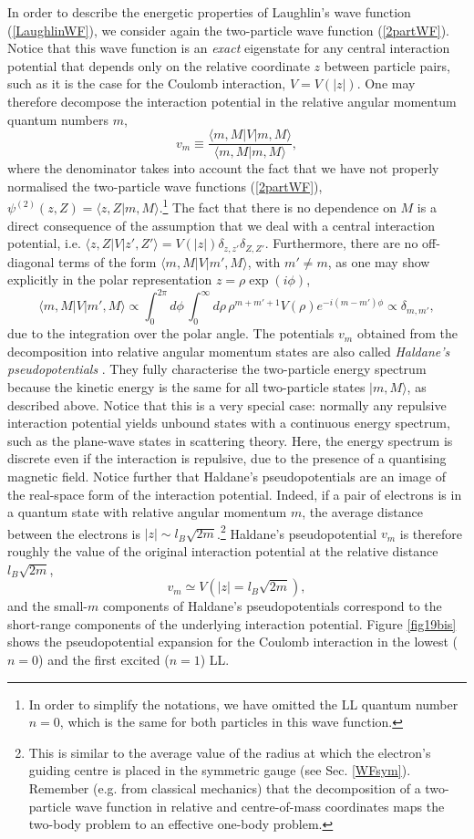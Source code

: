 \documentclass[10pt]{book}
\newcommand{\beq}{\begin{equation}}
\newcommand{\eeq}{\end{equation}}
\begin{document}
In order to describe the energetic properties of Laughlin's wave function (\ref{LaughlinWF}), we consider again the
two-particle wave function (\ref{2partWF}). Notice that this wave function is an {\sl exact} eigenstate for any central
interaction potential that depends only on the relative coordinate $z$ between particle pairs, such as it is the case for the 
Coulomb interaction, $V=V(|z|)$. One may therefore decompose the interaction potential in the relative angular momentum quantum
numbers $m$,
\beq\label{HaldanePP}
v_m\equiv \frac{\langle m,M|V|m,M\rangle}{\langle m,M|m,M\rangle},
\eeq
where the denominator takes into account the fact that we have not properly normalised the two-particle wave functions 
(\ref{2partWF}), $\psi^{(2)}(z,Z)=\langle z,Z|m,M\rangle$.\footnote{In order to simplify the notations,
we have omitted the LL quantum number $n=0$, which is 
the same for both particles in this wave function.}
The fact that there is no dependence on $M$ is a direct consequence of the assumption that we deal with 
a central interaction potential, i.e. $\langle z,Z|V|z',Z'\rangle = V(|z|)\delta_{z,z'}\delta_{Z,Z'}$. Furthermore, there 
are no off-diagonal terms of the form $\langle m,M|V|m',M\rangle$, with $m'\neq m$, as one may show explicitly in 
the polar representation $z=\rho \exp(i\phi)$,
$$\langle m,M|V|m',M\rangle \propto \int_{0}^{2\pi}d\phi\,\int_0^{\infty}d\rho\, \rho^{m+m'+1} V(\rho)e^{-i(m-m')\phi}
\propto \delta_{m,m'},$$
due to the integration over the polar angle.
The potentials $v_m$ obtained from the decomposition into relative angular momentum states are also called {\sl Haldane's
pseudopotentials} \cite{haldane}. They fully characterise the two-particle energy spectrum because the
kinetic energy is the same for all two-particle states $|m,M\rangle$, as described above. Notice that this is a very
special case: normally any repulsive interaction potential yields unbound states with a continuous energy spectrum, such
as the plane-wave states in scattering theory. Here,
the energy spectrum is discrete even if the interaction is repulsive, due to the presence of a quantising magnetic field.
Notice further that Haldane's pseudopotentials are an image of the real-space form of the interaction potential. Indeed,
if a pair of electrons is in a quantum state with relative angular momentum $m$, the average distance between the
electrons is $|z| \sim l_B\sqrt{2m}$.\footnote{This is similar to the average value of the radius at which the electron's
guiding centre is placed in the symmetric gauge (see Sec. \ref{WFsym}). Remember (e.g. from classical mechanics)
that the decomposition of a two-particle wave function
in relative and centre-of-mass coordinates maps the two-body problem to an effective one-body problem.}
Haldane's pseudopotential $v_m$ is therefore roughly the value of the original interaction potential at the relative 
distance $l_B\sqrt{2m}$, 
\beq\label{PPreal}
v_m \simeq V\left(|z|=l_B\sqrt{2m}\right),
\eeq
and the small-$m$ components of Haldane's pseudopotentials correspond to the short-range components of the underlying
interaction potential. Figure \ref{fig19bis} shows the pseudopotential expansion for the Coulomb interaction in the lowest 
($n=0$) and the first excited ($n=1$) LL.
\end{document}
